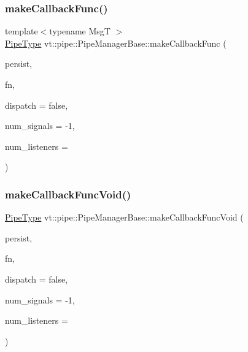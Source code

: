 \subsubsection{\texorpdfstring{make\+Callback\+Func()}{makeCallbackFunc()}}
{\footnotesize\ttfamily template$<$typename MsgT $>$ \\
\hyperlink{namespacevt_ac9852acda74d1896f48f406cd72c7bd3}{Pipe\+Type} vt\+::pipe\+::\+Pipe\+Manager\+Base\+::make\+Callback\+Func (\begin{DoxyParamCaption}\item[{bool const \&}]{persist,  }\item[{\hyperlink{structvt_1_1pipe_1_1_pipe_manager_base_aa54eee64ab32a27777a672d49eb861f4}{Func\+Msg\+Type}$<$ MsgT $>$}]{fn,  }\item[{bool const \&}]{dispatch = {\ttfamily false},  }\item[{\hyperlink{namespacevt_a9b39ce9494bb04674d0d5b895a5aa50f}{Ref\+Type}}]{num\+\_\+signals = {\ttfamily -\/1},  }\item[{\hyperlink{namespacevt_a9b39ce9494bb04674d0d5b895a5aa50f}{Ref\+Type}}]{num\+\_\+listeners = {} }\end{DoxyParamCaption})}

\mbox{\label{structvt_1_1pipe_1_1_pipe_manager_base_a20bf85e7494b5d018ed24b052f56fc28}} 
\subsubsection{\texorpdfstring{make\+Callback\+Func\+Void()}{makeCallbackFuncVoid()}}
{\footnotesize\ttfamily \hyperlink{namespacevt_ac9852acda74d1896f48f406cd72c7bd3}{Pipe\+Type} vt\+::pipe\+::\+Pipe\+Manager\+Base\+::make\+Callback\+Func\+Void (\begin{DoxyParamCaption}\item[{bool const \&}]{persist,  }\item[{\hyperlink{structvt_1_1pipe_1_1_pipe_manager_base_a7ddc75a14fa50cd8521641ef6f9ea78d}{Func\+Type}}]{fn,  }\item[{bool const \&}]{dispatch = {\ttfamily false},  }\item[{\hyperlink{namespacevt_a9b39ce9494bb04674d0d5b895a5aa50f}{Ref\+Type}}]{num\+\_\+signals = {\ttfamily -\/1},  }\item[{\hyperlink{namespacevt_a9b39ce9494bb04674d0d5b895a5aa50f}{Ref\+Type}}]{num\+\_\+listeners = {} }\end{DoxyParamCaption})}

